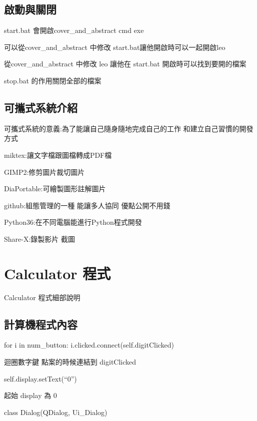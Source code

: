 \documentclass[12pt,,]{report}
\begin{document}
\hypertarget{ux555fux52d5ux8207ux95dcux9589}{%
\section{啟動與關閉}\label{ux555fux52d5ux8207ux95dcux9589}}

start.bat 會開啟cover\_and\_abstract cmd exe

可以從cover\_and\_abstract 中修改 start.bat讓他開啟時可以一起開啟leo

從cover\_and\_abstract 中修改 leo 讓他在 start.bat
開啟時可以找到要開的檔案

stop.bat 的作用關閉全部的檔案

\hypertarget{ux53efux651cux5f0fux7cfbux7d71ux4ecbux7d39}{%
\section{可攜式系統介紹}\label{ux53efux651cux5f0fux7cfbux7d71ux4ecbux7d39}}

可攜式系統的意義:為了能讓自己隨身隨地完成自己的工作
和建立自己習慣的開發方式

miktex:讓文字檔跟圖檔轉成PDF檔

GIMP2:修剪圖片裁切圖片

DiaPortable:可繪製圖形註解圖片

github:組態管理的一種 能讓多人協同 優點公開不用錢

Python36:在不同電腦能進行Python程式開發

Share-X:錄製影片 截圖

\hypertarget{calculator-ux7a0bux5f0f}{%
\chapter{Calculator 程式}\label{calculator-ux7a0bux5f0f}}

Calculator 程式細部說明

\hypertarget{ux8a08ux7b97ux6a5fux7a0bux5f0fux5167ux5bb9}{%
\section{計算機程式內容}\label{ux8a08ux7b97ux6a5fux7a0bux5f0fux5167ux5bb9}}

for i in num\_button: i.clicked.connect(self.digitClicked)

迴圈數字鍵 點案的時候連結到 digitClicked

self.display.setText(``0'')

起始 display 為 0

class Dialog(QDialog, Ui\_Dialog)
\end{document}
